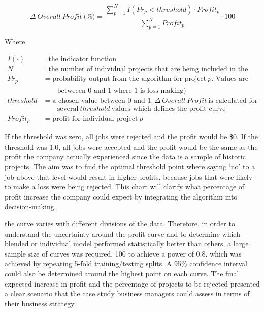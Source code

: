 \documentclass[]{elsarticle} %
\begin{document}
\begin{equation}
\Delta\ Overall\ Profit\ \textrm{(\%)} = \frac{\sum_{p = 1}^{N} I(Pr_p < threshold) \cdot Profit_p}{\sum_{p = 1}^{N} Profit_p} \cdot100
\end{equation}

Where

\[
\begin{aligned}
I(\cdot) &= \textrm{the indicator function} \\
N\ &= \textrm{the number of individual projects that are being included in the analysis} \\
Pr_{p} &= \textrm{probability output from the algorithm for project}\ p \textrm{. Values are}\\
& \qquad \textrm{betweeen 0 and 1 where 1 is loss making)} \\
threshold &= \textrm{a chosen value between 0 and 1.}\ \Delta\ Overall\ Profit\ \textrm{is calculated for} \\
& \qquad \textrm{several}\ threshold\ \textrm{values which defines the profit curve} \\
Profit_p &= \textrm{profit for individual project}\ p
\end{aligned}
\]

If the threshold was zero, all jobs were rejected and the profit would
be \$0. If the threshold was 1.0, all jobs were accepted and the profit
would be the same as the profit the company actually experienced since
the data is a sample of historic projects. The aim was to find the
optimal threshold point where saying `no' to a job above that level
would result in higher profits, because jobs that were likely to make a
loss were being rejected. This chart will clarify what percentage of
profit increase the company could expect by integrating the algorithm
into decision-making.

the curve varies with different divisions of the data. Therefore, in
order to understand the uncertainty around the profit curve and to
determine which blended or individual model performed statistically
better than others, a large sample size of curves was required. 100 to
achieve a power of 0.8. which was achieved by repeating 5-fold
training/testing splits. A 95\% confidence interval could also be
determined around the highest point on each curve. The final expected
increase in profit and the percentage of projects to be rejected
presented a clear scenario that the case study business managers could
assess in terms of their business strategy.
\end{document}
